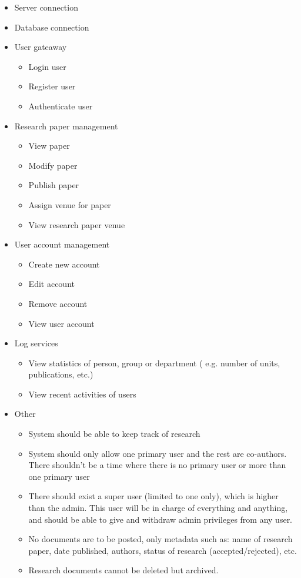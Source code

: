 \documentclass[11pt]{article}
\begin{document}
	\begin{itemize}
		\item Server connection
		\item Database connection
		\item User gateaway
		\begin{itemize}
			\item Login user
			\item Register user
			\item Authenticate user
		\end{itemize}
		\item Research paper management
		\begin{itemize}
			\item View paper
			\item Modify paper
			\item Publish paper
			\item Assign venue for paper
			\item View research paper venue
		\end{itemize}
		\item User account management
		\begin{itemize}
			\item Create new account
			\item Edit account
			\item Remove account
			\item View user account
		\end{itemize}
		\item Log services
		\begin{itemize}
			\item View statistics of person, group or department ( e.g. number of units, publications, etc.)
			\item View recent activities of users
		\end{itemize}
			\item Other
		\begin{itemize}
			\item System should be able to keep track of research
			\item System should only allow one primary user and the rest are co-authors. There shouldn’t be a time where there is no primary user or more than one primary user
			\item There should exist a super user (limited to one only), which is higher than the admin. This user will be in charge of everything and anything, and should be able to give and withdraw admin privileges from any user.
			\item No documents are to be posted, only metadata such as: name of research paper, date published, authors, status of research (accepted/rejected), etc.
			\item Research documents cannot be deleted but archived.			
		\end{itemize}
		
	\end{itemize}
	
\end{document}
